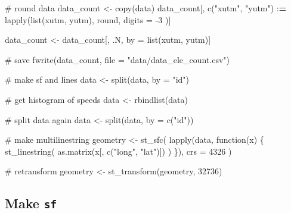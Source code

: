 \documentclass[]{article}
\newenvironment{Shaded}{}{}
\newcommand{\CommentTok}[1]{\textcolor[rgb]{0.00,0.50,0.00}{#1}}
\newcommand{\ControlFlowTok}[1]{\textcolor[rgb]{0.00,0.00,1.00}{#1}}
\newcommand{\DataTypeTok}[1]{#1}
\newcommand{\DecValTok}[1]{#1}
\newcommand{\ErrorTok}[1]{\textcolor[rgb]{1.00,0.00,0.00}{\textbf{#1}}}
\newcommand{\KeywordTok}[1]{\textcolor[rgb]{0.00,0.00,1.00}{#1}}
\newcommand{\NormalTok}[1]{#1}
\newcommand{\OperatorTok}[1]{#1}
\newcommand{\StringTok}[1]{\textcolor[rgb]{0.00,0.50,0.50}{#1}}
\begin{document}
\begin{Shaded}
\begin{Highlighting}[]
\CommentTok{# round data}
\NormalTok{data_count <-}\StringTok{ }\KeywordTok{copy}\NormalTok{(data)}
\NormalTok{data_count[, }\KeywordTok{c}\NormalTok{(}\StringTok{"xutm"}\NormalTok{, }\StringTok{"yutm"}\NormalTok{) }\OperatorTok{:}\ErrorTok{=}\StringTok{ }\KeywordTok{lapply}\NormalTok{(}\KeywordTok{list}\NormalTok{(xutm, yutm),}
\NormalTok{  round,}
  \DataTypeTok{digits =} \DecValTok{-3}
\NormalTok{)]}

\NormalTok{data_count <-}\StringTok{ }\NormalTok{data_count[, .N, by =}\StringTok{ }\KeywordTok{list}\NormalTok{(xutm, yutm)]}

\CommentTok{# save}
\KeywordTok{fwrite}\NormalTok{(data_count, }\DataTypeTok{file =} \StringTok{"data/data_ele_count.csv"}\NormalTok{)}
\end{Highlighting}
\end{Shaded}

\begin{Shaded}
\begin{Highlighting}[]
\CommentTok{# make sf and lines}
\NormalTok{data <-}\StringTok{ }\KeywordTok{split}\NormalTok{(data, }\DataTypeTok{by =} \StringTok{"id"}\NormalTok{)}

\CommentTok{# get histogram of speeds}
\NormalTok{data <-}\StringTok{ }\KeywordTok{rbindlist}\NormalTok{(data)}

\CommentTok{# split data again}
\NormalTok{data <-}\StringTok{ }\KeywordTok{split}\NormalTok{(data, }\DataTypeTok{by =} \KeywordTok{c}\NormalTok{(}\StringTok{"id"}\NormalTok{))}

\CommentTok{# make multilinestring}
\NormalTok{geometry <-}\StringTok{ }\KeywordTok{st_sfc}\NormalTok{(}
  \KeywordTok{lapply}\NormalTok{(data, }\ControlFlowTok{function}\NormalTok{(x) \{}
    \KeywordTok{st_linestring}\NormalTok{(}
      \KeywordTok{as.matrix}\NormalTok{(x[, }\KeywordTok{c}\NormalTok{(}\StringTok{"long"}\NormalTok{, }\StringTok{"lat"}\NormalTok{)])}
\NormalTok{    )}
\NormalTok{  \}),}
  \DataTypeTok{crs =} \DecValTok{4326}
\NormalTok{)}

\CommentTok{# retransform}
\NormalTok{geometry <-}\StringTok{ }\KeywordTok{st_transform}\NormalTok{(geometry, }\DecValTok{32736}\NormalTok{)}
\end{Highlighting}
\end{Shaded}

\hypertarget{make-sf}{%
\subsection{\texorpdfstring{Make \texttt{sf}}{Make sf}}\label{make-sf}}
\end{document}
